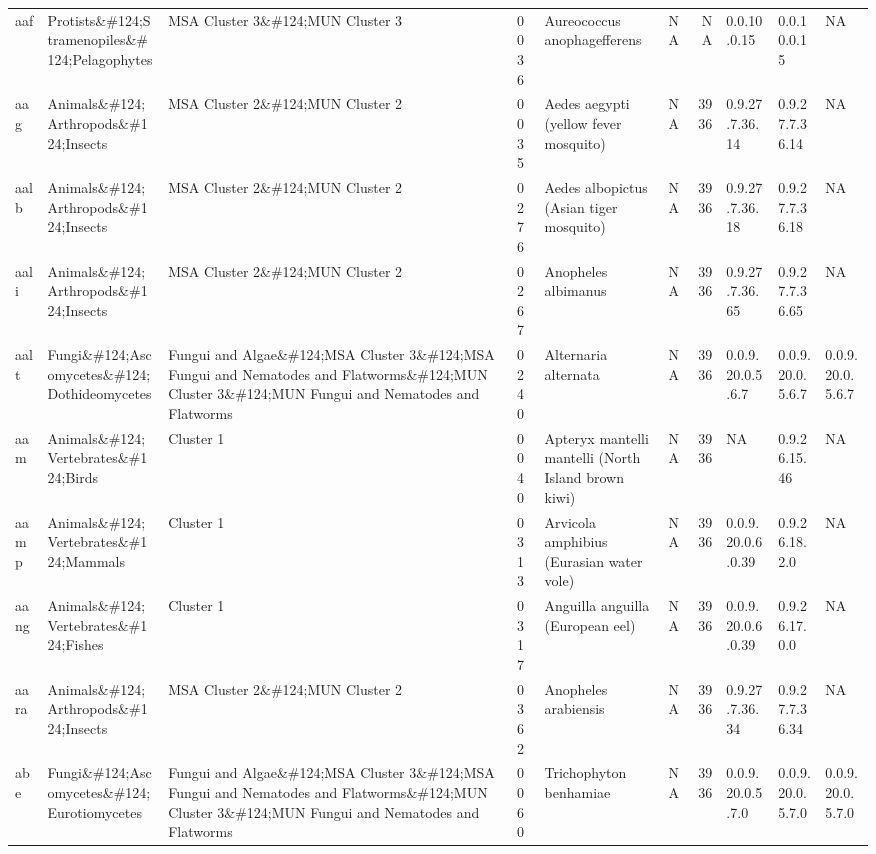 \documentclass[
  letterpaper,
  DIV=11,
  numbers=noendperiod]{scrreprt}
\begin{document}
\begin{longtable*}[t]{llllllrlll}
\toprule
{} &  &  &  &  &  &  &  &  & \\
\midrule
aaf & Protists\&\#124;Stramenopiles\&\#124;Pelagophytes & MSA Cluster 3\&\#124;MUN Cluster 3 & 0036 & Aureococcus anophagefferens & NA & NA & 0.0.10.0.15 & 0.0.10.0.15 & NA\\
aag & Animals\&\#124;Arthropods\&\#124;Insects & MSA Cluster 2\&\#124;MUN Cluster 2 & 0035 & Aedes aegypti (yellow fever mosquito) & NA & 3936 & 0.9.27.7.36.14 & 0.9.27.7.36.14 & NA\\
aalb & Animals\&\#124;Arthropods\&\#124;Insects & MSA Cluster 2\&\#124;MUN Cluster 2 & 0276 & Aedes albopictus (Asian tiger mosquito) & NA & 3936 & 0.9.27.7.36.18 & 0.9.27.7.36.18 & NA\\
aali & Animals\&\#124;Arthropods\&\#124;Insects & MSA Cluster 2\&\#124;MUN Cluster 2 & 0267 & Anopheles albimanus & NA & 3936 & 0.9.27.7.36.65 & 0.9.27.7.36.65 & NA\\
aalt & Fungi\&\#124;Ascomycetes\&\#124;Dothideomycetes & Fungui and Algae\&\#124;MSA Cluster 3\&\#124;MSA Fungui and Nematodes and Flatworms\&\#124;MUN Cluster 3\&\#124;MUN Fungui and Nematodes and Flatworms & 0240 & Alternaria alternata & NA & 3936 & 0.0.9.20.0.5.6.7 & 0.0.9.20.0.5.6.7 & 0.0.9.20.0.5.6.7\\
\addlinespace
aam & Animals\&\#124;Vertebrates\&\#124;Birds & Cluster 1 & 0040 & Apteryx mantelli mantelli (North Island brown kiwi) & NA & 3936 & NA & 0.9.26.15.46 & NA\\
aamp & Animals\&\#124;Vertebrates\&\#124;Mammals & Cluster 1 & 0313 & Arvicola amphibius (Eurasian water vole) & NA & 3936 & 0.0.9.20.0.6.0.39 & 0.9.26.18.2.0 & NA\\
aang & Animals\&\#124;Vertebrates\&\#124;Fishes & Cluster 1 & 0317 & Anguilla anguilla (European eel) & NA & 3936 & 0.0.9.20.0.6.0.39 & 0.9.26.17.0.0 & NA\\
aara & Animals\&\#124;Arthropods\&\#124;Insects & MSA Cluster 2\&\#124;MUN Cluster 2 & 0362 & Anopheles arabiensis & NA & 3936 & 0.9.27.7.36.34 & 0.9.27.7.36.34 & NA\\
abe & Fungi\&\#124;Ascomycetes\&\#124;Eurotiomycetes & Fungui and Algae\&\#124;MSA Cluster 3\&\#124;MSA Fungui and Nematodes and Flatworms\&\#124;MUN Cluster 3\&\#124;MUN Fungui and Nematodes and Flatworms & 0060 & Trichophyton benhamiae & NA & 3936 & 0.0.9.20.0.5.7.0 & 0.0.9.20.0.5.7.0 & 0.0.9.20.0.5.7.0\\

\end{longtable*}
\end{document}
